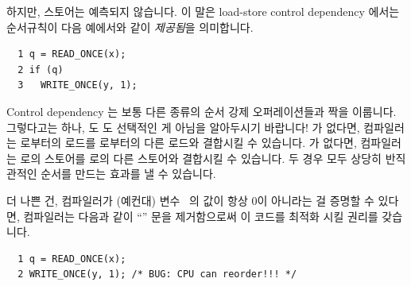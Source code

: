 하지만, 스토어는 예측되지 않습니다.
이 말은 load-store control dependency 에서는 순서규칙이 다음 예에서와 같이
\emph{제공됨}을 의미합니다.

\vspace{5pt}
\begin{minipage}[t]{\columnwidth}
\scriptsize
\begin{verbatim}
  1 q = READ_ONCE(x);
  2 if (q)
  3   WRITE_ONCE(y, 1);
\end{verbatim}
\end{minipage}
\vspace{5pt}

Control dependency 는 보통 다른 종류의 순서 강제 오퍼레이션들과 짝을 이룹니다.
그렇다고는 하나,  도  도 선택적인 게 아님을
알아두시기 바랍니다!
 가 없다면, 컴파일러는  로부터의 로드를  로부터의
다른 로드와 결합시킬 수 있습니다.
 가 없다면, 컴파일러는  로의 스토어를  로의 다른
스토어와 결합시킬 수 있습니다.
두 경우 모두 상당히 반직관적인 순서를 만드는 효과를 낼 수 있습니다.

더 나쁜 건, 컴파일러가 (예컨대) 변수~ 의 값이 항상 0이 아니라는 걸 증명할
수 있다면, 컴파일러는 다음과 같이 ``'' 문을 제거함으로써 이 코드를
최적화 시킬 권리를 갖습니다.

\vspace{5pt}
\begin{minipage}[t]{\columnwidth}
\scriptsize
\begin{verbatim}
  1 q = READ_ONCE(x);
  2 WRITE_ONCE(y, 1); /* BUG: CPU can reorder!!! */
\end{verbatim}
\end{minipage}
\vspace{5pt}

